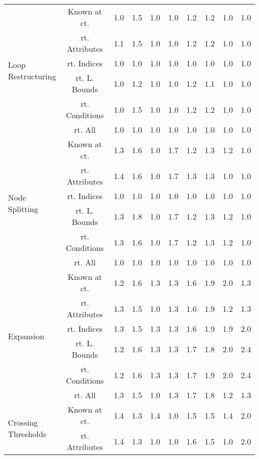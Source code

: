 \documentclass{article}
\begin{document}
\begin{longtable}{|p{2cm}|c|c|c|c|c|c|c|c|c|}
\hline
\multirow{6}{*}{ \parbox{2cm}{Loop\\Restructuring}} & Known at ct. & 1.0 & 1.5 & 1.0 & 1.0 & 1.2 & 1.2 & 1.0 & 1.0\\ \cline{2-10}
 & rt. Attributes & 1.1 & 1.5 & 1.0 & 1.0 & 1.2 & 1.2 & 1.0 & 1.0\\ \cline{2-10}
 & rt. Indices & 1.0 & 1.0 & 1.0 & 1.0 & 1.0 & 1.0 & 1.0 & 1.0\\ \cline{2-10}
 & rt. L. Bounds & 1.0 & 1.2 & 1.0 & 1.0 & 1.2 & 1.1 & 1.0 & 1.0\\ \cline{2-10}
 & rt. Conditions & 1.0 & 1.5 & 1.0 & 1.0 & 1.2 & 1.2 & 1.0 & 1.0\\ \cline{2-10}
 & rt. All & 1.0 & 1.0 & 1.0 & 1.0 & 1.0 & 1.0 & 1.0 & 1.0\\ \cline{2-10}
\hline
\multirow{6}{*}{ \parbox{2cm}{Node\\Splitting}} & Known at ct. & 1.3 & 1.6 & 1.0 & 1.7 & 1.2 & 1.3 & 1.2 & 1.0\\ \cline{2-10}
 & rt. Attributes & 1.4 & 1.6 & 1.0 & 1.7 & 1.3 & 1.3 & 1.0 & 1.0\\ \cline{2-10}
 & rt. Indices & 1.0 & 1.0 & 1.0 & 1.0 & 1.0 & 1.0 & 1.0 & 1.0\\ \cline{2-10}
 & rt. L. Bounds & 1.3 & 1.8 & 1.0 & 1.7 & 1.2 & 1.3 & 1.2 & 1.0\\ \cline{2-10}
 & rt. Conditions & 1.3 & 1.6 & 1.0 & 1.7 & 1.2 & 1.3 & 1.2 & 1.0\\ \cline{2-10}
 & rt. All & 1.0 & 1.0 & 1.0 & 1.0 & 1.0 & 1.0 & 1.0 & 1.0\\ \cline{2-10}
\hline
\multirow{6}{*}{ \parbox{2cm}{Expansion}} & Known at ct. & 1.2 & 1.6 & 1.3 & 1.3 & 1.6 & 1.9 & 2.0 & 1.3\\ \cline{2-10}
 & rt. Attributes & 1.3 & 1.5 & 1.0 & 1.3 & 1.6 & 1.9 & 1.2 & 1.3\\ \cline{2-10}
 & rt. Indices & 1.3 & 1.5 & 1.3 & 1.3 & 1.6 & 1.9 & 1.9 & 2.0\\ \cline{2-10}
 & rt. L. Bounds & 1.2 & 1.6 & 1.3 & 1.3 & 1.7 & 1.8 & 2.0 & 2.4\\ \cline{2-10}
 & rt. Conditions & 1.2 & 1.6 & 1.3 & 1.3 & 1.7 & 1.9 & 2.0 & 2.4\\ \cline{2-10}
 & rt. All & 1.3 & 1.5 & 1.0 & 1.3 & 1.7 & 1.8 & 1.2 & 1.3\\ \cline{2-10}
\hline
\multirow{6}{*}{ \parbox{2cm}{Crossing\\Thresholds}} & Known at ct. & 1.4 & 1.3 & 1.4 & 1.0 & 1.5 & 1.5 & 1.4 & 2.0\\ \cline{2-10}
 & rt. Attributes & 1.4 & 1.3 & 1.0 & 1.0 & 1.6 & 1.5 & 1.0 & 2.0\\ \cline{2-10}

\end{longtable}
\end{document}
